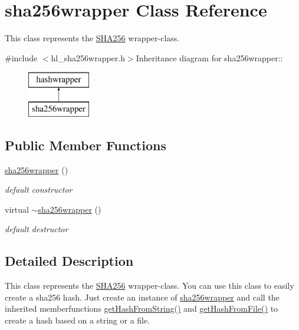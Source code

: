 \hypertarget{classsha256wrapper}{
\section{sha256wrapper Class Reference}
\label{classsha256wrapper}
}


This class represents the \hyperlink{class_s_h_a256}{SHA256} wrapper-\/class.  


{\ttfamily \#include $<$hl\_\-sha256wrapper.h$>$}Inheritance diagram for sha256wrapper::\begin{figure}[H]
\begin{center}
\leavevmode
\includegraphics[height=2cm]{classsha256wrapper}
\end{center}
\end{figure}
\subsection*{Public Member Functions}
\begin{DoxyCompactItemize}
\item 
\hyperlink{classsha256wrapper_afbbb810ba41289d4702d08f9e74e176d}{sha256wrapper} ()
\begin{DoxyCompactList}\small\item\em default constructor \item\end{DoxyCompactList}\item 
virtual \hyperlink{classsha256wrapper_a6f12b55e6d20d1b6cd629f6c8edda607}{$\sim$sha256wrapper} ()
\begin{DoxyCompactList}\small\item\em default destructor \item\end{DoxyCompactList}\end{DoxyCompactItemize}


\subsection{Detailed Description}
This class represents the \hyperlink{class_s_h_a256}{SHA256} wrapper-\/class. You can use this class to easily create a sha256 hash. Just create an instance of \hyperlink{classsha256wrapper}{sha256wrapper} and call the inherited memberfunctions \hyperlink{classhashwrapper_aa10904f0dc06eb54771ab26864622d0f}{getHashFromString()} and \hyperlink{classhashwrapper_ae4767e76e6d9e2b24b41f01ab9e7f03c}{getHashFromFile()} to create a hash based on a string or a file.

